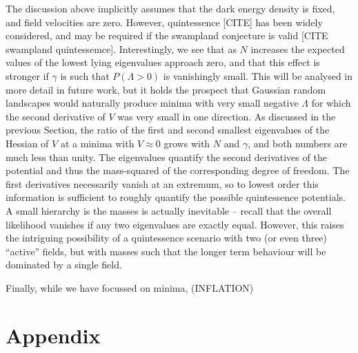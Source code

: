 \documentclass[12pt]{article}
\newcommand{\lfl}[1]{\textcolor{red}{[{\bf LL}: #1]}}
\begin{document}
The discussion above implicitly assumes that the dark energy density is fixed, and field velocities are zero. However, quintessence [CITE] has been widely considered, and may be required if the swampland conjecture is valid [CITE swampland quintessemce]. Interestingly, we see that as $N$ increases the expected values of the lowest lying eigenvalues approach zero, and that this effect is stronger if $\gamma$ is such that $P(\Lambda>0)$ is vanishingly small. This will be analysed in more detail in future work, but it holds the prospect that Gaussian random landscapes would naturally produce minima with very small negative $\Lambda$  for which the second derivative of $V$ was very small in one direction. As discussed in the previous Section, the ratio of the first and second smallest eigenvalues of the Hessian of $V$ at a minima with $V\approx0$ grows with $N$ and $\gamma$, and both numbers are much less than unity. The eigenvalues quantify the second derivatives of the potential and thus the mass-squared of the corresponding degree of freedom. The first derivatives necessarily vanish at an extremum, so to lowest order this information is sufficient to roughly quantify the possible quintessence potentials.   A small hierarchy is the masses is actually inevitable -- recall that the overall likelihood vanishes if any two eigenvalues are exactly equal. However, this raises the intriguing possibility of a quintessence scenario with two (or even three) ``active'' fields, but with masses such that the longer term behaviour will be dominated by a single field. 

Finally, while  we have focussed on minima,  (INFLATION)


\section{Appendix}
%
%
\end{document}
